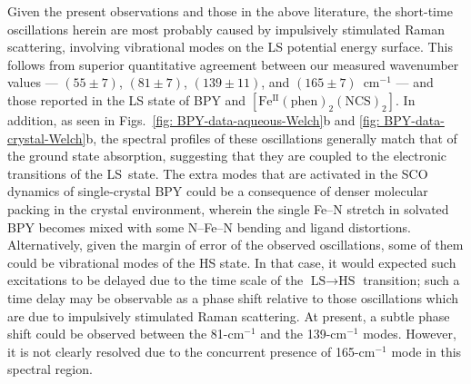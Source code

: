 Given the present observations and those in the above literature,
the short-time oscillations herein are most probably caused by
impulsively stimulated Raman scattering, involving vibrational modes on
the LS potential energy surface.
%
This follows from superior quantitative agreement between our measured wavenumber values ---
$(55 \pm 7)$, $(81 \pm 7)$, $(139 \pm 11)$, and $(165 \pm 7)$~cm$^{-1}$ ---
and those reported in the LS state of BPY and $\mathrm{[Fe^{II}(phen)_2(NCS)_2]}$.
%
In addition, as seen in Figs.~\ref{fig: BPY-data-aqueous-Welch}b
and \ref{fig: BPY-data-crystal-Welch}b,
the spectral profiles of these oscillations generally match that
of the ground state absorption, suggesting that they are coupled to
the electronic transitions of the LS~state.
%
The extra modes that are activated in the SCO dynamics of single-crystal BPY
could be a consequence of denser molecular packing in the crystal environment,
wherein the single Fe--N stretch in solvated BPY becomes mixed
with some N--Fe--N bending and ligand distortions.
%
Alternatively, given the margin of error of the observed oscillations,
some of them could be vibrational modes of the HS state.
In that case, it would expected such excitations to be delayed
due to the time scale of the $\text{LS} \rightarrow \text{HS}$ transition;
such a time delay may be observable as a phase shift relative
to those oscillations which are due to impulsively stimulated Raman scattering.
%
At present, a subtle phase shift could be observed between the 81-cm$^{-1}$
and the 139-cm$^{-1}$ modes. However, it is not clearly resolved
due to the concurrent presence of 165-cm$^{-1}$ mode in this spectral region.

